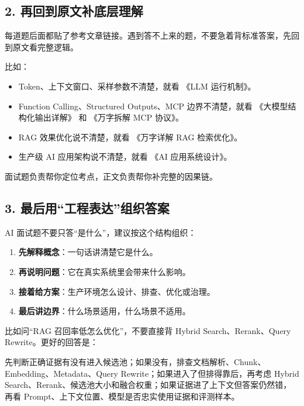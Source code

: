 \documentclass[9pt,a4paper,twocolumn]{ctexart}
\begin{document}
\subsection*{2. 再回到原文补底层理解}


每道题后面都贴了参考文章链接。遇到答不上来的题，不要急着背标准答案，先回到原文看完整逻辑。



比如：


\begin{itemize}[itemsep=1pt, topsep=2pt]
  \item Token、上下文窗口、采样参数不清楚，就看 《LLM 运行机制》。
  \item Function Calling、Structured Outputs、MCP 边界不清楚，就看 《大模型结构化输出详解》 和 《万字拆解 MCP 协议》。
  \item RAG 效果优化说不清楚，就看 《万字详解 RAG 检索优化》。
  \item 生产级 AI 应用架构说不清楚，就看 《AI 应用系统设计》。
\end{itemize}


面试题负责帮你定位考点，正文负责帮你补完整的因果链。



\subsection*{3. 最后用“工程表达”组织答案}


AI 面试题不要只答“是什么”，建议按这个结构组织：


\begin{enumerate}[itemsep=1pt, topsep=2pt]
  \item \textbf{先解释概念}：一句话讲清楚它是什么。
  \item \textbf{再说明问题}：它在真实系统里会带来什么影响。
  \item \textbf{接着给方案}：生产环境怎么设计、排查、优化或治理。
  \item \textbf{最后讲边界}：什么场景适用，什么场景不适用。
\end{enumerate}


比如问“RAG 召回率低怎么优化”，不要直接背 Hybrid Search、Rerank、Query Rewrite。更好的回答是：



先判断正确证据有没有进入候选池；如果没有，排查文档解析、Chunk、Embedding、Metadata、Query Rewrite；如果进入了但排得靠后，再考虑 Hybrid Search、Rerank、候选池大小和融合权重；如果证据进了上下文但答案仍然错，再看 Prompt、上下文位置、模型是否忠实使用证据和评测样本。
\end{document}
